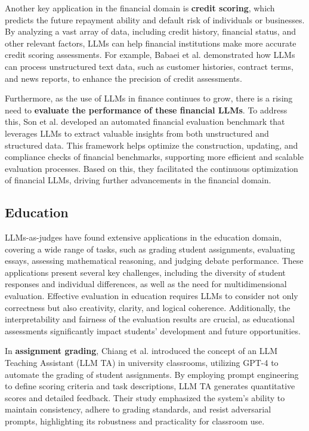 Another key application in the financial domain is \textbf{credit scoring}, which predicts the future repayment ability and default risk of individuals or businesses. By analyzing a vast array of data, including credit history, financial status, and other relevant factors, LLMs can help financial institutions make more accurate credit scoring assessments. For example, Babaei et al. \cite{babaei2024gpt} demonstrated how LLMs can process unstructured text data, such as customer histories, contract terms, and news reports, to enhance the precision of credit assessments.

Furthermore, as the use of LLMs in finance continues to grow, there is a rising need to \textbf{evaluate the performance of these financial LLMs}. To address this, Son et al. \cite{son2024krx} developed an automated financial evaluation benchmark that leverages LLMs to extract valuable insights from both unstructured and structured data. This framework helps optimize the construction, updating, and compliance checks of financial benchmarks, supporting more efficient and scalable evaluation processes. Based on this, they facilitated the continuous optimization of financial LLMs, driving further advancements in the financial domain.

\subsection{Education}
\label{sec:Education}
LLMs-as-judges have found extensive applications in the education domain, covering a wide range of tasks, such as grading student assignments, evaluating essays, assessing mathematical reasoning, and judging debate performance. These applications present several key challenges, including the diversity of student responses and individual differences, as well as the need for multidimensional evaluation. Effective evaluation in education requires LLMs to consider not only correctness but also creativity, clarity, and logical coherence. Additionally, the interpretability and fairness of the evaluation results are crucial, as educational assessments significantly impact students' development and future opportunities.

In \textbf{assignment grading}, Chiang et al. \cite{chiang2024large} introduced
the concept of an LLM Teaching Assistant (LLM TA) in university classrooms, utilizing GPT-4 to
automate the grading of student assignments. By employing prompt engineering to define scoring
criteria and task descriptions, LLM TA generates quantitative scores and detailed feedback. Their
study emphasized the system’s ability to maintain consistency, adhere to grading standards, and
resist adversarial prompts, highlighting its robustness and practicality for classroom use.

